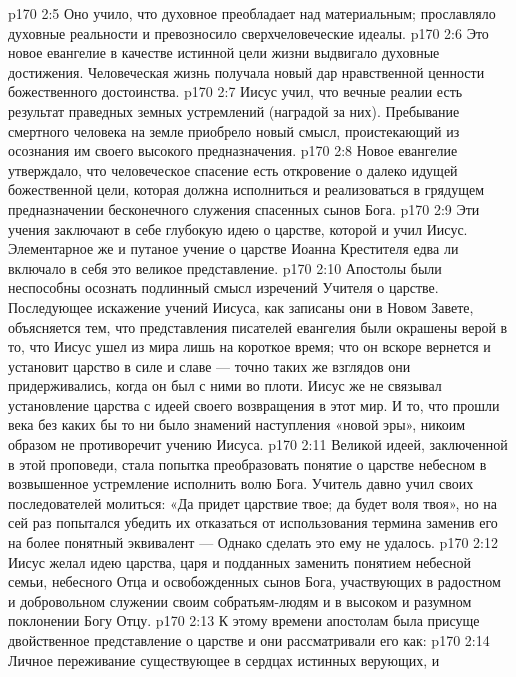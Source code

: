 \vs p170 2:5 \pc {}\bibnobreakspace Оно учило, что духовное преобладает над материальным; прославляло духовные реальности и превозносило сверхчеловеческие идеалы.
\vs p170 2:6 \pc {}\bibnobreakspace Это новое евангелие в качестве истинной цели жизни выдвигало духовные достижения. Человеческая жизнь получала новый дар нравственной ценности божественного достоинства.
\vs p170 2:7 \pc {}\bibnobreakspace Иисус учил, что вечные реалии есть результат праведных земных устремлений (наградой за них). Пребывание смертного человека на земле приобрело новый смысл, проистекающий из осознания им своего высокого предназначения.
\vs p170 2:8 \pc {}\bibnobreakspace Новое евангелие утверждало, что человеческое спасение есть откровение о далеко идущей божественной цели, которая должна исполниться и реализоваться в грядущем предназначении бесконечного служения спасенных сынов Бога.
\vs p170 2:9 \pc Эти учения заключают в себе глубокую идею о царстве, которой и учил Иисус. Элементарное же и путаное учение о царстве Иоанна Крестителя едва ли включало в себя это великое представление.
\vs p170 2:10 Апостолы были неспособны осознать подлинный смысл изречений Учителя о царстве. Последующее искажение учений Иисуса, как записаны они в Новом Завете, объясняется тем, что представления писателей евангелия были окрашены верой в то, что Иисус ушел из мира лишь на короткое время; что он вскоре вернется и установит царство в силе и славе --- точно таких же взглядов они придерживались, когда он был с ними во плоти. Иисус же не связывал установление царства с идеей своего возвращения в этот мир. И то, что прошли века без каких бы то ни было знамений наступления «новой эры», никоим образом не противоречит учению Иисуса.
\vs p170 2:11 Великой идеей, заключенной в этой проповеди, стала попытка преобразовать понятие о царстве небесном в возвышенное устремление исполнить волю Бога. Учитель давно учил своих последователей молиться: «Да придет царствие твое; да будет воля твоя», но на сей раз попытался убедить их отказаться от использования термина  заменив его на более понятный эквивалент ---  Однако сделать это ему не удалось.
\vs p170 2:12 Иисус желал идею царства, царя и подданных заменить понятием небесной семьи, небесного Отца и освобожденных сынов Бога, участвующих в радостном и добровольном служении своим собратьям\hyp{}людям и в высоком и разумном поклонении Богу Отцу.
\vs p170 2:13 К этому времени апостолам была присуще двойственное представление о царстве и они рассматривали его как:
\vs p170 2:14 \bibnobreakspace Личное переживание существующее в сердцах истинных верующих, и
